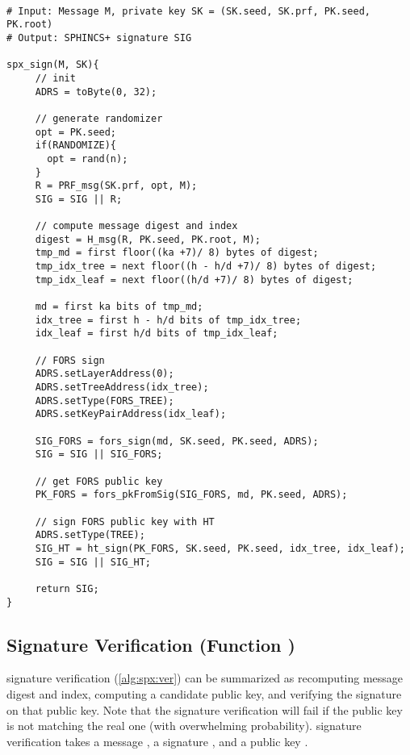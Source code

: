 \begin{lstlisting}[label=alg:spx:sign, mathescape, language=pseudoc,
                   caption=\spxsign\ -- Generating a \spx signature]

# Input: Message M, private key SK = (SK.seed, SK.prf, PK.seed, PK.root)
# Output: SPHINCS+ signature SIG

spx_sign(M, SK){
     // init
     ADRS = toByte(0, 32);

     // generate randomizer
     opt = PK.seed;
     if(RANDOMIZE){
       opt = rand(n);
     }
     R = PRF_msg(SK.prf, opt, M);
     SIG = SIG || R;

     // compute message digest and index
     digest = H_msg(R, PK.seed, PK.root, M);
     tmp_md = first floor((ka +7)/ 8) bytes of digest;
     tmp_idx_tree = next floor((h - h/d +7)/ 8) bytes of digest;
     tmp_idx_leaf = next floor((h/d +7)/ 8) bytes of digest;

     md = first ka bits of tmp_md;
     idx_tree = first h - h/d bits of tmp_idx_tree;
     idx_leaf = first h/d bits of tmp_idx_leaf;

     // FORS sign
     ADRS.setLayerAddress(0);
     ADRS.setTreeAddress(idx_tree);
     ADRS.setType(FORS_TREE);
     ADRS.setKeyPairAddress(idx_leaf);

     SIG_FORS = fors_sign(md, SK.seed, PK.seed, ADRS);
     SIG = SIG || SIG_FORS;

     // get FORS public key
     PK_FORS = fors_pkFromSig(SIG_FORS, md, PK.seed, ADRS);

     // sign FORS public key with HT
     ADRS.setType(TREE);
     SIG_HT = ht_sign(PK_FORS, SK.seed, PK.seed, idx_tree, idx_leaf);
     SIG = SIG || SIG_HT;

     return SIG;
}
\end{lstlisting}

\subsection{\spx Signature Verification (Function \spxverify)}

   \spx signature verification (\autoref{alg:spx:ver}) can be summarized as
   recomputing message digest and index, computing a candidate \fors public key,
   and verifying the \hyper signature on that public key. Note that the \hyper
   signature verification will fail if the \fors public key is not matching the
   real one (with overwhelming probability). \spx signature verification takes
   a message \msg, a signature \spxsig, and a \spx public key \PK.

